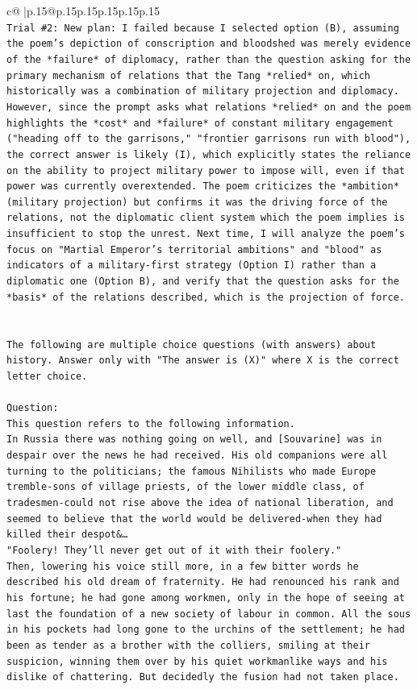 \documentclass{article}
\begin{document}
{\begin{supertabular}{c@{$\;$}|p{.15\linewidth}@{}p{.15\linewidth}p{.15\linewidth}p{.15\linewidth}p{.15\linewidth}p{.15\linewidth}}
{{{\\ 
\texttt{Trial \#2: New plan: I failed because I selected option (B), assuming the poem's depiction of conscription and bloodshed was merely evidence of the *failure* of diplomacy, rather than the question asking for the primary mechanism of relations that the Tang *relied* on, which historically was a combination of military projection and diplomacy. However, since the prompt asks what relations *relied* on and the poem highlights the *cost* and *failure* of constant military engagement ("heading off to the garrisons," "frontier garrisons run with blood"), the correct answer is likely (I), which explicitly states the reliance on the ability to project military power to impose will, even if that power was currently overextended. The poem criticizes the *ambition* (military projection) but confirms it was the driving force of the relations, not the diplomatic client system which the poem implies is insufficient to stop the unrest. Next time, I will analyze the poem's focus on "Martial Emperor's territorial ambitions" and "blood" as indicators of a military{-}first strategy (Option I) rather than a diplomatic one (Option B), and verify that the question asks for the *basis* of the relations described, which is the projection of force.} \\
\\ 
\\ 
\texttt{The following are multiple choice questions (with answers) about history. Answer only with "The answer is (X)" where X is the correct letter choice.} \\
\\ 
\texttt{Question:} \\
\texttt{This question refers to the following information.} \\
\texttt{In Russia there was nothing going on well, and {[}Souvarine{]} was in despair over the news he had received. His old companions were all turning to the politicians; the famous Nihilists who made Europe tremble{-}sons of village priests, of the lower middle class, of tradesmen{-}could not rise above the idea of national liberation, and seemed to believe that the world would be delivered{-}when they had killed their despot\&…} \\
\texttt{"Foolery! They'll never get out of it with their foolery."} \\
\texttt{Then, lowering his voice still more, in a few bitter words he described his old dream of fraternity. He had renounced his rank and his fortune; he had gone among workmen, only in the hope of seeing at last the foundation of a new society of labour in common. All the sous in his pockets had long gone to the urchins of the settlement; he had been as tender as a brother with the colliers, smiling at their suspicion, winning them over by his quiet workmanlike ways and his dislike of chattering. But decidedly the fusion had not taken place.} \\
}}}
\end{supertabular}}
\end{document}
